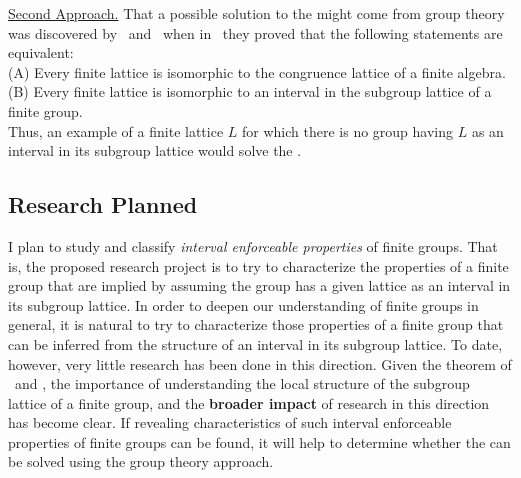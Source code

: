\vskip2mm
\noindent \underline{Second Approach.}
That a possible
solution to the \flrp might come from group theory was discovered by %
\Palfy\ and \Pudlak\ when in~\cite{Palfy:1980}
they proved that the following statements are equivalent:\\[4pt]
(A) Every finite lattice is isomorphic to the congruence lattice of a finite algebra.\\[4pt]
(B) Every finite lattice is isomorphic to an interval %
in the subgroup lattice of a finite group.\\[4pt]
Thus, an example of a finite lattice $L$ for which there is no
group having $L$ as an interval in its subgroup lattice would solve the \flrp.

\subsection{Research Planned}
I plan to study and classify \emph{interval enforceable properties} of finite groups.
That is, the proposed research project is to try
to characterize the properties of a finite group that are implied by
assuming the group has a given lattice as an interval in its subgroup lattice.
In order to deepen our understanding of finite groups in general,
it is natural to try to characterize those properties of a finite group that can be
inferred from the structure of an interval in its subgroup lattice.  To date, however,
very little research has been done in this direction. Given the theorem of \Palfy\ and
\Pudlak, the importance of understanding the local structure of the
subgroup lattice of a finite group, and the {\bf broader impact} of research in
this direction has become clear.
If revealing characteristics of such interval enforceable
properties of finite groups can be found, it will help to determine whether the
\flrp can be solved using the group theory approach.


